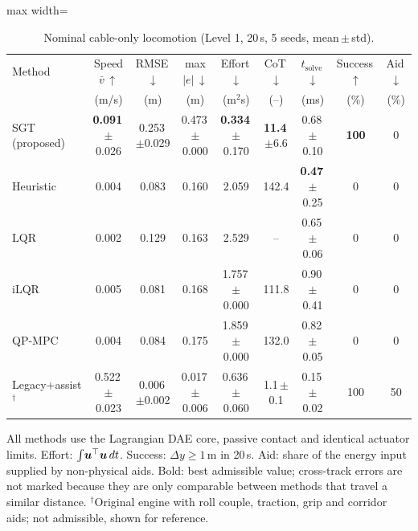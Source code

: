 \begin{table}[t]
\centering
\caption{Nominal cable-only locomotion (Level 1, 20\,s, 5 seeds, mean\,$\pm$\,std).}
\label{tab:nominal}
\setlength{\tabcolsep}{3.2pt}
\renewcommand{\arraystretch}{1.08}
\footnotesize
\begin{adjustbox}{max width=\textwidth}
\begin{tabular}{@{}lcccccccc@{}}
\toprule
Method & Speed $\bar v$\,$\uparrow$ & RMSE\,$\downarrow$ & max $|e|$\,$\downarrow$ & Effort\,$\downarrow$ & CoT\,$\downarrow$ & $t_{\mathrm{solve}}$\,$\downarrow$ & Success\,$\uparrow$ & Aid\,$\downarrow$ \\
 & {\scriptsize (m/s)} & {\scriptsize (m)} & {\scriptsize (m)} & {\scriptsize (m$^2$s)} & {\scriptsize (--)} & {\scriptsize (ms)} & {\scriptsize (\%)} & {\scriptsize (\%)} \\
\midrule
SGT (proposed) & \textbf{0.091}\,{\scriptsize$\pm$0.026} & 0.253\,{\scriptsize$\pm$0.029} & 0.473\,{\scriptsize$\pm$0.000} & \textbf{0.334}\,{\scriptsize$\pm$0.170} & \textbf{11.4}\,{\scriptsize$\pm$6.6} & 0.68\,{\scriptsize$\pm$0.10} & \textbf{100} & 0 \\
Heuristic & 0.004 & 0.083 & 0.160 & 2.059 & 142.4 & \textbf{0.47}\,{\scriptsize$\pm$0.25} & 0 & 0 \\
LQR & 0.002 & 0.129 & 0.163 & 2.529 & -- & 0.65\,{\scriptsize$\pm$0.06} & 0 & 0 \\
iLQR & 0.005 & 0.081 & 0.168 & 1.757\,{\scriptsize$\pm$0.000} & 111.8 & 0.90\,{\scriptsize$\pm$0.41} & 0 & 0 \\
QP-MPC & 0.004 & 0.084 & 0.175 & 1.859\,{\scriptsize$\pm$0.000} & 132.0 & 0.82\,{\scriptsize$\pm$0.05} & 0 & 0 \\
Legacy+assist$^\dagger$ & 0.522\,{\scriptsize$\pm$0.023} & 0.006\,{\scriptsize$\pm$0.002} & 0.017\,{\scriptsize$\pm$0.006} & 0.636\,{\scriptsize$\pm$0.060} & 1.1\,{\scriptsize$\pm$0.1} & 0.15\,{\scriptsize$\pm$0.02} & 100 & 50 \\
\bottomrule
\end{tabular}
\end{adjustbox}
\par\vspace{3pt}\parbox{\textwidth}{\scriptsize\raggedright All methods use the Lagrangian DAE core, passive contact and identical actuator limits. Effort: $\int\!\boldsymbol{u}^{\top}\boldsymbol{u}\,dt$. Success: $\Delta y \ge 1$\,m in 20\,s. Aid: share of the energy input supplied by non-physical aids. Bold: best admissible value; cross-track errors are not marked because they are only comparable between methods that travel a similar distance. $^\dagger$Original engine with roll couple, traction, grip and corridor aids; not admissible, shown for reference.}
\end{table}
